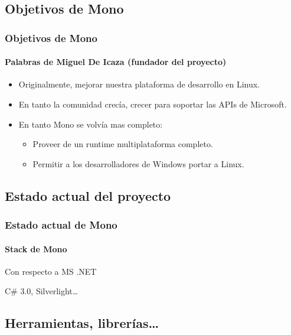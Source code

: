 \documentclass{beamer}
\begin{document}
\subsection{Objetivos de Mono}

\begin{frame}
  \frametitle{Objetivos de Mono}
  \framesubtitle{Palabras de Miguel De Icaza (fundador del proyecto)}

  \begin{itemize}
    \item Originalmente, mejorar nuestra plataforma de desarrollo en Linux.
    \item En tanto la comunidad crecía, crecer para soportar las APIs de Microsoft.

    \item En tanto Mono se volvía mas completo:
      \begin{itemize}
        \item Proveer de un runtime multiplataforma completo.
        \item Permitir a los desarrolladores de Windows portar a Linux.
      \end{itemize}
  \end{itemize}
\end{frame}


\subsection{Estado actual del proyecto}

\begin{frame}[plain]
  \frametitle{Estado actual de Mono}
  \framesubtitle{Stack de Mono}

  \begin{centering}
  \end{centering}
\end{frame}

\begin{frame}[plain]{Con respecto a MS .NET}
  \begin{centering}
  \end{centering}

  \vspace{2ex}
  C\# 3.0, Silverlight\ldots
\end{frame}


\subsection{Herramientas, librerías\ldots}
\end{document}
